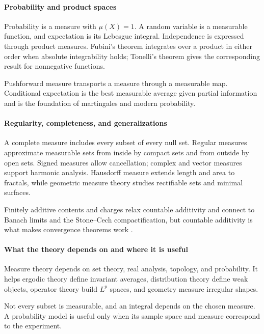 \paragraph{Probability and product spaces}
Probability is a measure with $\mu(X)=1$. A random variable is a measurable function, and expectation is its Lebesgue integral. Independence is expressed through product measures. Fubini's theorem integrates over a product in either order when absolute integrability holds; Tonelli's theorem gives the corresponding result for nonnegative functions.

Pushforward measure transports a measure through a measurable map. Conditional expectation is the best measurable average given partial information and is the foundation of martingales and modern probability.

\paragraph{Regularity, completeness, and generalizations}
A complete measure includes every subset of every null set. Regular measures approximate measurable sets from inside by compact sets and from outside by open sets. Signed measures allow cancellation; complex and vector measures support harmonic analysis. Hausdorff measure extends length and area to fractals, while geometric measure theory studies rectifiable sets and minimal surfaces.

Finitely additive contents and charges relax countable additivity and connect to Banach limits and the Stone--Cech compactification, but countable additivity is what makes convergence theorems work \cite{measure_theory_ref2}.

\paragraph{What the theory depends on and where it is useful}
Measure theory depends on set theory, real analysis, topology, and probability. It helps ergodic theory define invariant averages, distribution theory define weak objects, operator theory build $L^p$ spaces, and geometry measure irregular shapes.

Not every subset is measurable, and an integral depends on the chosen measure. A probability model is useful only when its sample space and measure correspond to the experiment.


